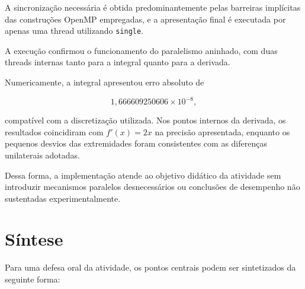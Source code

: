 A sincronização necessária é obtida predominantemente pelas barreiras
implícitas das construções OpenMP empregadas, e a apresentação final é
executada por apenas uma thread utilizando \texttt{single}.

A execução confirmou o funcionamento do paralelismo aninhado, com duas
threads internas tanto para a integral quanto para a derivada.

Numericamente, a integral apresentou erro absoluto de

\[
1{,}666609250606\times10^{-8},
\]

compatível com a discretização utilizada. Nos pontos internos da derivada, os
resultados coincidiram com $f'(x)=2x$ na precisão apresentada, enquanto os
pequenos desvios das extremidades foram consistentes com as diferenças
unilaterais adotadas.

Dessa forma, a implementação atende ao objetivo didático da atividade sem
introduzir mecanismos paralelos desnecessários ou conclusões de desempenho
não sustentadas experimentalmente.


\section{Síntese}
\label{sec:atvd08-defesa}

Para uma defesa oral da atividade, os pontos centrais podem ser sintetizados
da seguinte forma:

